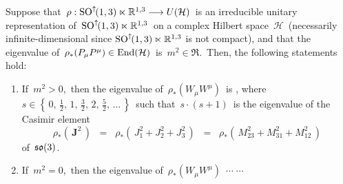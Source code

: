 \vskip 0.5cm
\begin{theorem}[Eigenvalues of $C_{2} = W_{\mu}W^{\mu}$ in relation to those of $C_{1} = P_{\mu}P^{\mu}$]
\mbox{}
\vskip 0.1cm
\noindent
Suppose that
\,$\rho : \textnormal{SO}^{\uparrow\!}(1,3) \ltimes \mathbb{R}^{1,3} \longrightarrow U(\mathcal{H})$\,
is an irreducible unitary representation of
\,$\textnormal{SO}^{\uparrow\!}(1,3) \ltimes \mathbb{R}^{1,3}$\,
on a complex Hilbert space
\,$\mathcal{H}$\,
(necessarily infinite-dimensional since $\textnormal{SO}^{\uparrow\!}(1,3) \ltimes \mathbb{R}^{1,3}$ is not compact), and
that the eigenvalue of
\,$\rho_{*}\!\left(P_{\mu}P^{\mu}\right) \in \textnormal{End}(\mathcal{H})$\, is \,$m^{2} \in \Re$.\,
Then, the following statements hold:
\begin{enumerate}
\item
	If \,$m^{2} > 0$,\, then the eigenvalue of
	\,$\rho_{*}\!\left(W_{\mu}W^{\mu}\right)$\,
	is ,\; where
	\,$s \in \left\{\,0,\,\frac{1}{2},\,1,\,\frac{3}{2},\,2,\,\frac{5}{2},\,\ldots\,\right\}$\,
	such that \,$s \cdot (s+1)$\, is the eigenvalue of the Casimir element
	\begin{equation*}
	\rho_{*}\!\left(\,\mathbf{J}^{2}\,\right)
	\;\; = \;\;
		\rho_{*}\!\left(\,J_{1}^{2} + J_{2}^{2} + J_{3}^{2}\,\right)
	\;\; = \;\;
		\rho_{*}\!\left(\,M_{23}^{2} + M_{31}^{2} + M_{12}^{2}\,\right)
	\end{equation*}
	of \,$\mathfrak{so}(3)$.\,
\item
	If \,$m^{2} = 0$,\, then the eigenvalue of
	\,$\rho_{*}\!\left(W_{\mu}W^{\mu}\right)$\,
	$\cdots\;\cdots$
\end{enumerate}
\end{theorem}
\proof
